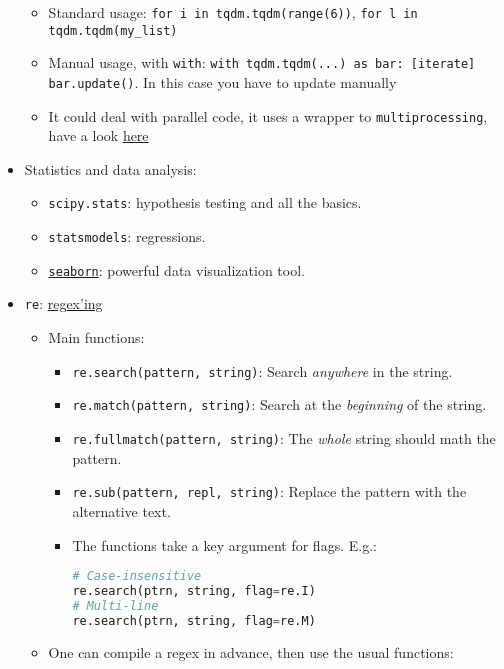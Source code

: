 \documentclass[a4paper,12pt,%
              final%
              ]{article}
\begin{document}
\begin{itemize}
\begin{itemize}
      \item Standard usage: \verb|for i in tqdm.tqdm(range(6))|, \verb|for l in tqdm.tqdm(my_list)|
      \item Manual usage, with \texttt{with}: \verb|with tqdm.tqdm(...) as bar: [iterate] bar.update()|. In this case you have to update manually
      \item It could deal with parallel code, it uses a wrapper to \texttt{multiprocessing}, have a look \href{https://tqdm.github.io/docs/contrib.concurrent/}{here}
    \end{itemize}
  \item Statistics and data analysis:
    \begin{itemize}
      \item \texttt{scipy.stats}: hypothesis testing and all the basics.
      \item \texttt{statsmodels}: regressions.
      \item \href{https://seaborn.pydata.org/introduction.html}{\texttt{seaborn}}: powerful data visualization tool.
    \end{itemize}
  \item \texttt{re}: \href{https://docs.python.org/3/library/re.html}{regex'ing}
    \begin{itemize}
      \item Main functions:
        \begin{itemize}
          \item \verb|re.search(pattern, string)|: Search \emph{anywhere} in the string.
          \item \verb|re.match(pattern, string)|: Search at the \emph{beginning} of the string.
          \item \verb|re.fullmatch(pattern, string)|: The \emph{whole} string should math the pattern.
          \item \verb|re.sub(pattern, repl, string)|: Replace the pattern with the alternative text.
          \item The functions take a key argument for flags. E.g.:
\begin{lstlisting}[language=python]
# Case-insensitive
re.search(ptrn, string, flag=re.I)
# Multi-line
re.search(ptrn, string, flag=re.M)
\end{lstlisting}
        \end{itemize}
      \item One can compile a regex in advance, then use the usual functions:
\begin{lstlisting}[language=python]

\end{lstlisting}
\end{itemize}
\end{itemize}
\end{document}
